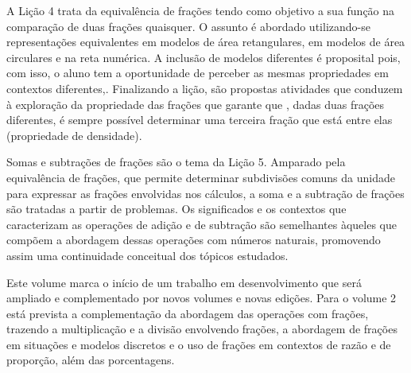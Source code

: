 A Lição 4 trata da equivalência de frações tendo como objetivo a sua função na comparação de duas frações quaisquer. O assunto é abordado utilizando-se representações equivalentes em modelos de área retangulares, em modelos de área circulares e na reta numérica. A inclusão de modelos diferentes é proposital pois, com isso, o aluno tem a oportunidade de perceber as mesmas propriedades em contextos diferentes,. Finalizando a lição, são propostas atividades que conduzem à exploração da propriedade das frações que garante que , dadas duas frações diferentes, é sempre possível determinar uma terceira fração que está entre elas (propriedade de densidade).

Somas e subtrações de frações são o tema da Lição 5. Amparado pela equivalência de frações, que permite determinar subdivisões comuns da unidade para expressar as frações envolvidas nos cálculos, a soma e a subtração de frações são tratadas a partir de problemas. Os significados e os contextos que caracterizam as operações de adição e de subtração são semelhantes àqueles que compõem a abordagem dessas operações com números naturais, promovendo assim uma continuidade conceitual dos tópicos estudados.

Este volume marca o início de um trabalho em desenvolvimento que será ampliado e complementado por novos volumes e novas edições. Para o volume 2 está prevista a complementação da abordagem das operações com frações, trazendo a multiplicação e a divisão envolvendo frações, a abordagem de frações em situações e modelos discretos e o uso de frações em contextos de razão e de proporção, além das porcentagens.

